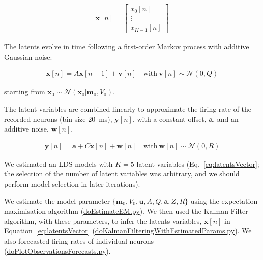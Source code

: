 \documentclass[12pt]{article}
\begin{document}
\begin{align}
    \mathbf{x}[n]=\left[\begin{array}{c}
        x_0[n]\\
                            \vdots\\
                            x_{K-1}[n]
                        \end{array}\right]
    \label{eq:latentsVector}
\end{align}

The latents evolve in time following a first-order Markov process with additive
Gaussian noise:

\begin{align*}
    \mathbf{x}[n]=A\mathbf{x}[n-1]+\mathbf{v}[n]\quad\text{with}\ \mathbf{v}[n]\sim\mathcal{N}(0, Q)
\end{align*}

\noindent starting from
$\mathbf{x}_0\sim\mathcal{N}(\mathbf{x}_0|\mathbf{m}_0,V_0)$.

The latent variables are combined linearly to approximate the firing rate of
the recorded neurons (bin size 20~ms), $\mathbf{y}[n]$, with a constant offset,
$\mathbf{a}$, and an additive noise, $\mathbf{w}[n]$.

\begin{align*}
    \mathbf{y}[n]=\mathbf{a}+C\mathbf{x}[n]+\mathbf{w}[n]\quad\text{with}\ \mathbf{w}[n]\sim\mathcal{N}(0, R)
\end{align*}

We estimated an LDS models with $K=5$ latent variables
(Eq.~\ref{eq:latentsVector}; the selection of the number of latent variables
was arbitrary, and we should perform model selection in later iterations).

We estimate  the model parameter $\{\mathbf{m}_0, V_0, \mathbf{u}, A, Q,
\mathbf{a}, Z, R\}$ using the expectation maximisation algorithm
(\href{https://github.com/joacorapela/lds_neuralLatents_striatum/blob/master/code/scripts/doEstimateEM.py}{doEstimateEM.py}).
%
We then used the Kalman Filter algorithm, with these parameters, to infer the
latents variables, $\mathbf{x}[n]$ in Equation~\ref{eq:latentsVector}
(\href{https://github.com/joacorapela/lds_neuralLatents_striatum/blob/master/code/scripts/doKalmanFilteringWithEstimatedParams.py}{doKalmanFilteringWithEstimatedParams.py}).
%
We also forecasted firing rates of individual neurons
(\href{https://github.com/joacorapela/lds_neuralLatents_striatum/blob/master/code/scripts/doPlotObservationsForecasts.py}{doPlotObservationsForecasts.py}).
\end{document}
